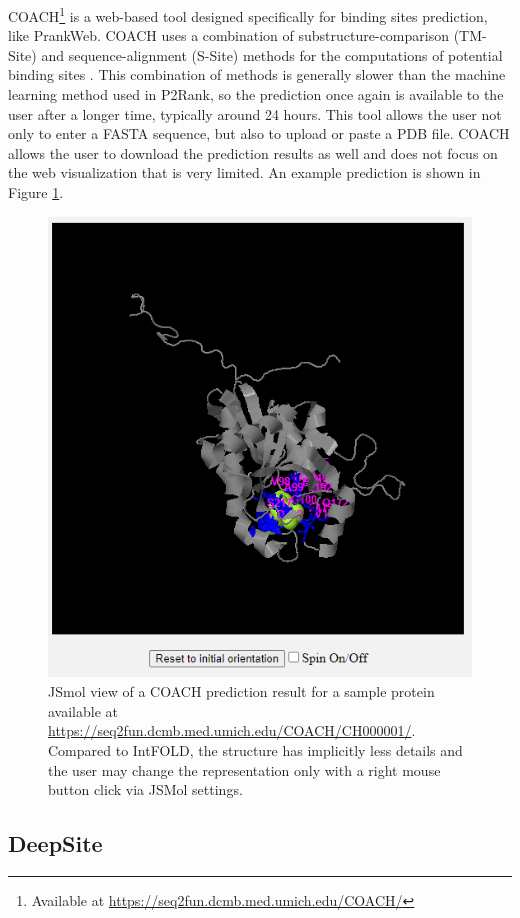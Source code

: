 COACH\footnote{Available at \url{https://seq2fun.dcmb.med.umich.edu/COACH/}} is a web-based tool designed specifically for binding sites prediction, like PrankWeb. COACH uses a combination of substructure-comparison (TM-Site) and sequence-alignment (S-Site) methods for the computations of potential binding sites \cite{yang2013protein}. This combination of methods is generally slower than the machine learning method used in P2Rank, so the prediction once again is available to the user after a longer time, typically around 24 hours. This tool allows the user not only to enter a FASTA sequence, but also to upload or paste a PDB file. COACH allows the user to download the prediction results as well and does not focus on the web visualization that is very limited. An example prediction is shown in Figure \ref{fig:coach_prediction}.

\begin{figure}
    \centering
    \includegraphics[width=.75\linewidth]{img/coach_prediction.png}
    \caption{JSmol view of a COACH prediction result for a sample protein available at \url{https://seq2fun.dcmb.med.umich.edu/COACH/CH000001/}. Compared to IntFOLD, the structure has implicitly less details and the user may change the representation only with a right mouse button click via JSMol settings.}
    \label{fig:coach_prediction}
\end{figure}

\subsection{DeepSite}
\label{subsec:deepsite}

